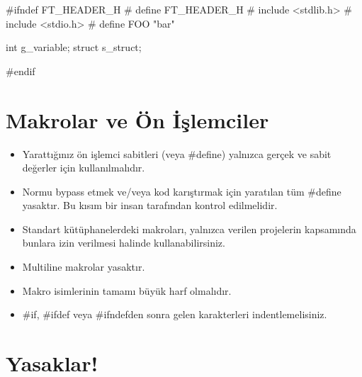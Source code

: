 \documentclass{42-en}
\begin{document}
        \begin{42ccode}
#ifndef FT_HEADER_H
# define FT_HEADER_H
# include <stdlib.h>
# include <stdio.h>
# define FOO "bar"

int		g_variable;
struct	s_struct;

#endif
        \end{42ccode}
        \newpage

    \section{Makrolar ve Ön İşlemciler}

        \begin{itemize}

            \item Yarattığınız ön işlemci sabitleri (veya \#define) yalnızca gerçek ve sabit değerler için kullanılmalıdır.

            \item Normu bypass etmek ve/veya kod karıştırmak için yaratılan tüm \#define yasaktır. Bu kısım bir insan tarafından kontrol edilmelidir.

            \item Standart kütüphanelerdeki makroları, yalnızca verilen projelerin kapsamında bunlara izin verilmesi halinde
kullanabilirsiniz.

            \item Multiline makrolar yasaktır.

            \item Makro isimlerinin tamamı büyük harf olmalıdır.

            \item \#if, \#ifdef veya \#ifndefden sonra gelen karakterleri indentlemelisiniz.

        \end{itemize}
        \newpage


    \section{Yasaklar!}
\end{document}
